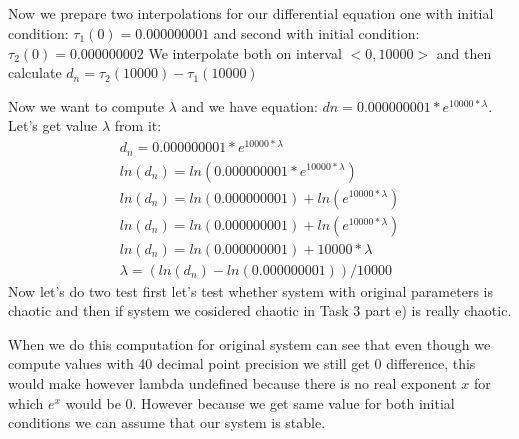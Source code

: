 \documentclass[a4paper]{article}
\begin{document}
	\subsection{}
	Now we prepare two interpolations for our differential equation
	one with initial condition: 
	$\tau_1(0)=0.000000001$
	and second with initial condition:
	$\tau_2(0)=0.000000002$
	We interpolate both on interval $<0,10000>$ and then calculate $d_n=\tau_2(10000)-\tau_1(10000)$
	
	
	Now we want to compute $\lambda$ and we have equation:
	$dn=0.000000001*e^{10000*\lambda}$. Let's get value $\lambda$ from it:
	\begin{align*}
		d_n=0.000000001*e^{10000*\lambda} 
		\\
		ln(d_n)=ln(0.000000001*e^{10000*\lambda})
		\\
		ln(d_n)=ln(0.000000001)+ln(e^{10000*\lambda})
		\\
		ln(d_n)=ln(0.000000001)+ln(e^{10000*\lambda})
		\\
		ln(d_n)=ln(0.000000001)+10000*\lambda
		\\
		\lambda=(ln(d_n)-ln(0.000000001))/10000
	\end{align*}
	Now let's do two test first let's test whether system with original parameters is chaotic and then if system we cosidered chaotic in Task 3 part e) is really chaotic.
	
	When we do this computation for original system can see that even though we compute values with 40 decimal point precision we still get 0 difference, this would make however lambda undefined because there is no real exponent $x$ for which $e^x$ would be 0. However because we get same value for both initial conditions we can assume that our system is stable.
	
\end{document}

